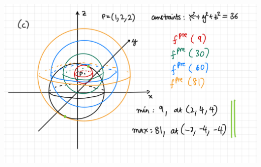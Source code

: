 \documentclass[a4paper, 12pt]{article}
\begin{document}
\begin{solution}
\begin{center}
        \includegraphics[width=16cm]{./figures/7.5c.jpeg}
    \end{center}
\end{solution}
\end{document}
